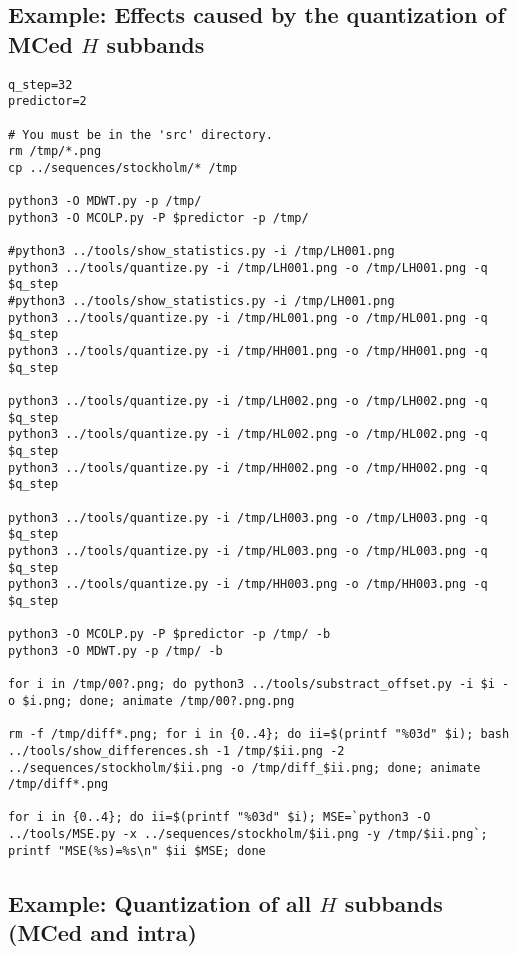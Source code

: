 
\subsection{Example: Effects caused by the quantization of MCed $H$ subbands}

\begin{verbatim}
q_step=32
predictor=2

# You must be in the 'src' directory.
rm /tmp/*.png
cp ../sequences/stockholm/* /tmp

python3 -O MDWT.py -p /tmp/
python3 -O MCOLP.py -P $predictor -p /tmp/

#python3 ../tools/show_statistics.py -i /tmp/LH001.png
python3 ../tools/quantize.py -i /tmp/LH001.png -o /tmp/LH001.png -q $q_step
#python3 ../tools/show_statistics.py -i /tmp/LH001.png
python3 ../tools/quantize.py -i /tmp/HL001.png -o /tmp/HL001.png -q $q_step
python3 ../tools/quantize.py -i /tmp/HH001.png -o /tmp/HH001.png -q $q_step

python3 ../tools/quantize.py -i /tmp/LH002.png -o /tmp/LH002.png -q $q_step
python3 ../tools/quantize.py -i /tmp/HL002.png -o /tmp/HL002.png -q $q_step
python3 ../tools/quantize.py -i /tmp/HH002.png -o /tmp/HH002.png -q $q_step

python3 ../tools/quantize.py -i /tmp/LH003.png -o /tmp/LH003.png -q $q_step
python3 ../tools/quantize.py -i /tmp/HL003.png -o /tmp/HL003.png -q $q_step
python3 ../tools/quantize.py -i /tmp/HH003.png -o /tmp/HH003.png -q $q_step

python3 -O MCOLP.py -P $predictor -p /tmp/ -b
python3 -O MDWT.py -p /tmp/ -b

for i in /tmp/00?.png; do python3 ../tools/substract_offset.py -i $i -o $i.png; done; animate /tmp/00?.png.png

rm -f /tmp/diff*.png; for i in {0..4}; do ii=$(printf "%03d" $i); bash ../tools/show_differences.sh -1 /tmp/$ii.png -2 ../sequences/stockholm/$ii.png -o /tmp/diff_$ii.png; done; animate /tmp/diff*.png

for i in {0..4}; do ii=$(printf "%03d" $i); MSE=`python3 -O ../tools/MSE.py -x ../sequences/stockholm/$ii.png -y /tmp/$ii.png`; printf "MSE(%s)=%s\n" $ii $MSE; done
\end{verbatim}


\subsection{Example: Quantization of all $H$ subbands (MCed and intra)}

